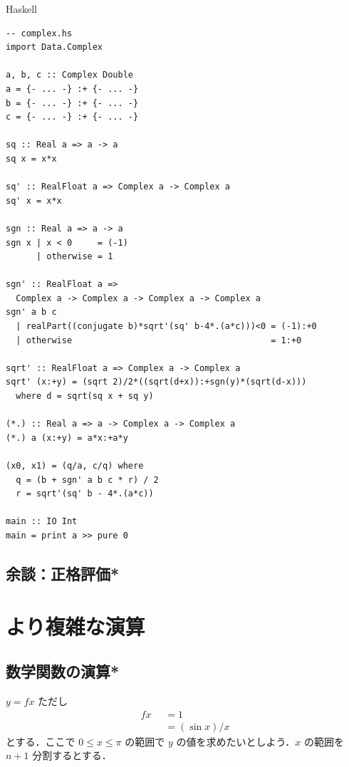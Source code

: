 \documentclass[a5paper,twoside,fleqn,draft]{jsbook}
\newcommand{\programminglanguage}[1]{\textsf{#1}}
\newcommand{\haskell}{\programminglanguage{Haskell}}
\newenvironment{haskellcode}{\begin{itembox}[r]{\haskell}}{\end{itembox}}
\newcommand{\mKeyword}[1]{\mathsf{#1}}
\newcommand{\mOtherwiseKeyword}{\mKeyword{otherwise}}
\DeclareMathOperator{\mOtherwise}{\mOtherwiseKeyword}
\newcommand{\mGuard}[1]{\mathop{\mid_{#1}}}
\begin{document}
\begin{haskellcode}
\begin{verbatim}
-- complex.hs
import Data.Complex

a, b, c :: Complex Double
a = {- ... -} :+ {- ... -}
b = {- ... -} :+ {- ... -}
c = {- ... -} :+ {- ... -}

sq :: Real a => a -> a
sq x = x*x

sq' :: RealFloat a => Complex a -> Complex a
sq' x = x*x

sgn :: Real a => a -> a
sgn x | x < 0     = (-1)
      | otherwise = 1

sgn' :: RealFloat a =>
  Complex a -> Complex a -> Complex a -> Complex a
sgn' a b c
  | realPart((conjugate b)*sqrt'(sq' b-4*.(a*c)))<0 = (-1):+0
  | otherwise                                       = 1:+0

sqrt' :: RealFloat a => Complex a -> Complex a
sqrt' (x:+y) = (sqrt 2)/2*((sqrt(d+x)):+sgn(y)*(sqrt(d-x)))
  where d = sqrt(sq x + sq y)

(*.) :: Real a => a -> Complex a -> Complex a
(*.) a (x:+y) = a*x:+a*y

(x0, x1) = (q/a, c/q) where
  q = (b + sgn' a b c * r) / 2
  r = sqrt'(sq' b - 4*.(a*c))

main :: IO Int
main = print a >> pure 0
\end{verbatim}
\end{haskellcode}

\section{余談：正格評価*}



\chapter{より複雑な演算}
\label{ch:more-arithmetic}

\section{数学関数の演算*}

$y=fx$ ただし
\begin{equation}
\begin{aligned}
fx&\mGuard{x\equiv0}=1\\
&\mGuard{\mOtherwise}=(\sin x)/x
\end{aligned}
\end{equation}
とする．ここで $0\le x\le\pi$ の範囲で $y$ の値を求めたいとしよう．$x$
の範囲を $n+1$ 分割するとする．
\end{document}
